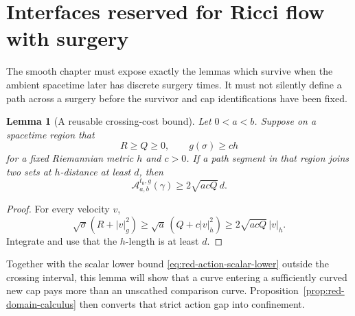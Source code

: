 \documentclass[10pt]{coll-l}
\newtheorem{lemma}[theorem]{Lemma}
\theoremstyle{definition}
\theoremstyle{remark}
\numberwithin{section}{chapter}
\numberwithin{equation}{chapter}
\begin{document}
\section{Interfaces reserved for Ricci flow with surgery}
\label{sec:red-surgery-interface}

The smooth chapter must expose exactly the lemmas which survive when the
ambient spacetime later has discrete surgery times.  It must not silently
define a path across a surgery before the survivor and cap identifications
have been fixed.

\begin{lemma}[A reusable crossing-cost bound]
\label{lem:red-crossing-cost}
Let $0<a<b$.  Suppose on a spacetime region that
\begin{equation}
                        R\geq Q\geq0,
                        \qquad g(\sigma)\geq c h         \label{eq:red-crossing-hypotheses}
\end{equation}
for a fixed Riemannian metric $h$ and $c>0$.  If a path segment in that
region joins two sets at $h$-distance at least $d$, then
\begin{equation}
                 \mathcal A^{t_0,g}_{a,b}(\gamma)
                 \geq2\sqrt{acQ}\,d.                   \label{eq:red-crossing-cost}
\end{equation}
\end{lemma}

\begin{proof}
For every velocity $v$,
\begin{equation}
 \sqrt\sigma(R+|v|_g^2)
 \geq\sqrt a\,(Q+c|v|_h^2)
 \geq2\sqrt{acQ}\,|v|_h.                               \label{eq:red-crossing-pointwise}
\end{equation}
Integrate and use that the $h$-length is at least $d$.
\end{proof}

Together with the scalar lower bound
\eqref{eq:red-action-scalar-lower} outside the crossing interval, this lemma
will show that a curve entering a sufficiently curved new cap pays more than
an unscathed comparison curve.  Proposition~\ref{prop:red-domain-calculus}
then converts that strict action gap into confinement.
\end{document}
